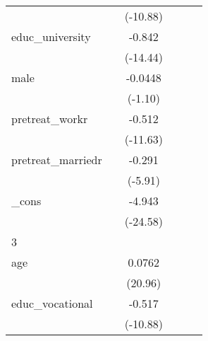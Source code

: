 {\begin{tabular}{l*{5}{c}}
            &                     &    (-10.88)         &                     &                     &                     \\
[1em]
educ\_university&                     &      -0.842\sym{***}&                     &                     &                     \\
            &                     &    (-14.44)         &                     &                     &                     \\
[1em]
male        &                     &     -0.0448         &                     &                     &                     \\
            &                     &     (-1.10)         &                     &                     &                     \\
[1em]
pretreat\_workr&                     &      -0.512\sym{***}&                     &                     &                     \\
            &                     &    (-11.63)         &                     &                     &                     \\
[1em]
pretreat\_marriedr&                     &      -0.291\sym{***}&                     &                     &                     \\
            &                     &     (-5.91)         &                     &                     &                     \\
[1em]
\_cons      &                     &      -4.943\sym{***}&                     &                     &                     \\
            &                     &    (-24.58)         &                     &                     &                     \\
\hline
3           &                     &                     &                     &                     &                     \\
age         &                     &      0.0762\sym{***}&                     &                     &                     \\
            &                     &     (20.96)         &                     &                     &                     \\
[1em]
educ\_vocational&                     &      -0.517\sym{***}&                     &                     &                     \\
            &                     &    (-10.88)         &                     &                     &                     \\

\end{tabular}}
